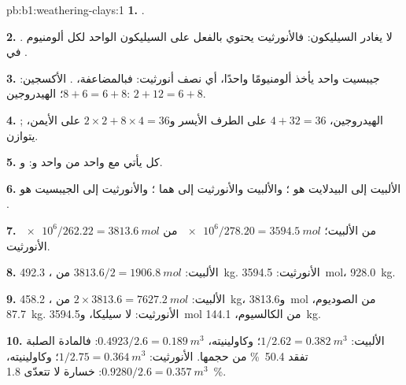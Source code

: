 \begin{solution}{pb:b1:weathering-clays:1}
\textbf{1.} .

\textbf{2.} . لا يغادر السيليكون: فالأنورثيت يحتوي بالفعل على السيليكون الواحد لكل ألومنيوم في .

\textbf{3.} جيبسيت واحد يأخذ ألومنيومًا واحدًا، أي نصف أنورثيت: فبالمضاعفة،
. الأكسجين: $8 + 6 = 6 + 8$؛ الهيدروجين: $2 + 12 = 6 + 8$.

\textbf{4.} ; %
الهيدروجين، $4 + 32 = 36$ على الطرف الأيسر و$2\times2 + 8\times4 = 36$ على
الأيمن، يتوازن.

\textbf{5.} كل  يأتي مع  واحد من  واحد و:
و.

\textbf{6.} الألبيت إلى البيدلايت هو ؛ والألبيت والأنورثيت إلى  هما ؛ والأنورثيت إلى الجيبسيت هو .

\textbf{7.} $\num{e6}/262.22 = \qty{3813.6}{mol}$ من الألبيت؛
$\num{e6}/278.20 = \qty{3594.5}{mol}$ من الأنورثيت.

\textbf{8.} الألبيت: $3813.6/2 = \qty{1906.8}{mol}$ من ،
\qty{492.3}{kg}. الأنورثيت: \qty{3594.5}{mol}، \qty{928.0}{kg}.

\textbf{9.} الألبيت: $2\times3813.6 = \qty{7627.2}{mol}$ من ،
\qty{458.2}{kg}، و\qty{3813.6}{mol} من الصوديوم، \qty{87.7}{kg}. الأنورثيت:
لا سيليكا، و\qty{3594.5}{mol} من الكالسيوم، \qty{144.1}{kg}.

\textbf{10.} الألبيت: $1/2.62 = \qty{0.382}{m^3}$؛ وكاولينيته،
$0.4923/2.6 = \qty{0.189}{m^3}$: فالمادة الصلبة تفقد \qty{50.4}{\percent} من
حجمها. الأنورثيت: $1/2.75 = \qty{0.364}{m^3}$؛ وكاولينيته،
$0.9280/2.6 = \qty{0.357}{m^3}$: خسارة لا تتعدّى \qty{1.8}{\percent}.


\end{solution}
